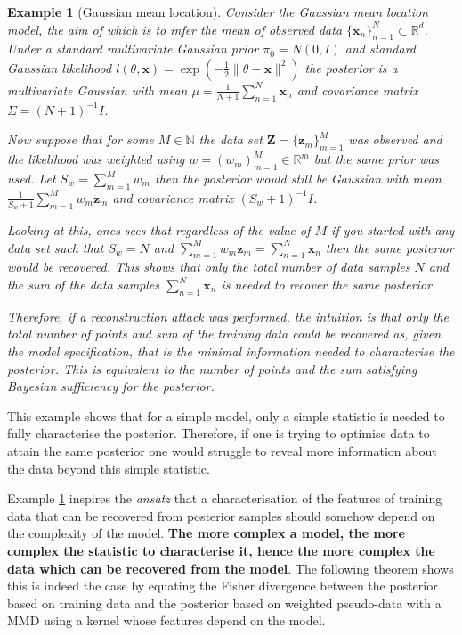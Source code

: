 \documentclass[hyperref]{article}
\theoremstyle{plain}
\newtheorem{example}{Example}[section]
\theoremstyle{remark}
\newcommand{\bx}{\mathbf{x}}
\newcommand{\bz}{\mathbf{z}}
\newcommand{\bZ}{\mathbf{Z}}
\newcommand{\bbR}{\mathbb{R}}
\newcommand{\bbN}{\mathbb{N}}
\begin{document}
\begin{example}[Gaussian mean location]\label{exp:mean_loc}
	Consider the Gaussian mean location model, the aim of which is to infer the mean of observed data $\{\mathbf{x}_{n}\}_{n=1}^{N}\subset\bbR^{d}$. Under a standard multivariate Gaussian prior $\pi_{0} = N(0,I)$ and standard Gaussian likelihood $l(\theta, \bx) = \exp(-\frac{1}{2}\lVert \theta - \bx\rVert^{2})$ the posterior is a multivariate Gaussian with mean 
	$\mu = \frac{1}{N+1}\sum_{n=1}^{N}\bx_{n}$ and covariance matrix $\Sigma = (N+1)^{-1}I$. 
	
	Now suppose that for some $M\in\bbN$ the data set $\bZ = \{\bz_{m}\}_{m=1}^{M}$ was observed and the likelihood was weighted using $w = (w_{m})_{m=1}^{M}\in\bbR^{m}$ but the same prior was used. Let $S_{w} = \sum_{m=1}^{M}w_{m}$ then the posterior would still be Gaussian with mean $\frac{1}{S_{w} + 1}\sum_{m=1}^{M}w_{m}\bz_{m}$ and covariance matrix $(S_{w} + 1)^{-1}I$.
	
	Looking at this, ones sees that regardless of the value of $M$ if you started with any data set such that $S_{w} = N$ and $\sum_{m=1}^{M}w_{m}\bz_{m} = \sum_{n=1}^{N}\bx_{n}$ then the same posterior would be recovered. This shows that only the total number of data samples $N$ and the sum of the data samples $\sum_{n=1}^{N}\bx_{n}$ is needed to recover the same posterior. 
	
	Therefore, if a reconstruction attack was performed, the intuition is that only the total number of points and sum of the training data could be recovered as, given the model specification, that is the minimal information needed to characterise the posterior. This is equivalent to the number of points and the sum satisfying Bayesian sufficiency for the posterior.
\end{example}

This example shows that for a simple model, only a simple statistic is needed to fully characterise the posterior. Therefore, if one is trying to optimise data to attain the same posterior one would struggle to reveal more information about the data beyond this simple statistic. 

Example \ref{exp:mean_loc} inspires the \textit{ansatz} that a characterisation of the features of training data that can be recovered from posterior samples should somehow depend on the complexity of the model. \textbf{The more complex a model, the more complex the statistic to characterise it, hence the more complex the data which can be recovered from the model}. The following theorem shows this is indeed the case by equating the Fisher divergence between the posterior based on training data and the posterior based on weighted pseudo-data with a MMD using a kernel whose features depend on the model. 
\end{document}
